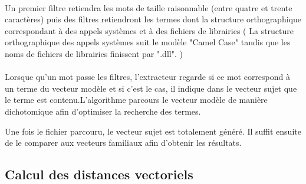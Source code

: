 \documentclass[a4paper, 12pt]{book}
\begin{document}
\paragraph{}
Un premier filtre retiendra les mots de taille raisonnable (entre quatre et trente caractères) puis des filtres retiendront les termes  dont la structure orthographique correspondant à des appels systèmes et à des fichiers de librairies ( La structure orthographique des appels systèmes suit le modèle "Camel Case" tandis que les noms de fichiers de librairies finissent par ".dll". )
\paragraph{}
Lorsque qu'un mot passe les filtres, l'extracteur regarde si ce mot correspond à un terme du vecteur modèle et si c'est le cas, il indique dans le vecteur sujet que le terme est contenu.L'algorithme parcours le vecteur modèle de manière dichotomique  afin d'optimiser la recherche des termes.

Une fois le fichier parcouru, le vecteur sujet est totalement généré. Il suffit ensuite de le comparer aux vecteurs familiaux afin d'obtenir les résultats.
\newpage
\subsection{Calcul des distances vectoriels}
\end{document}
